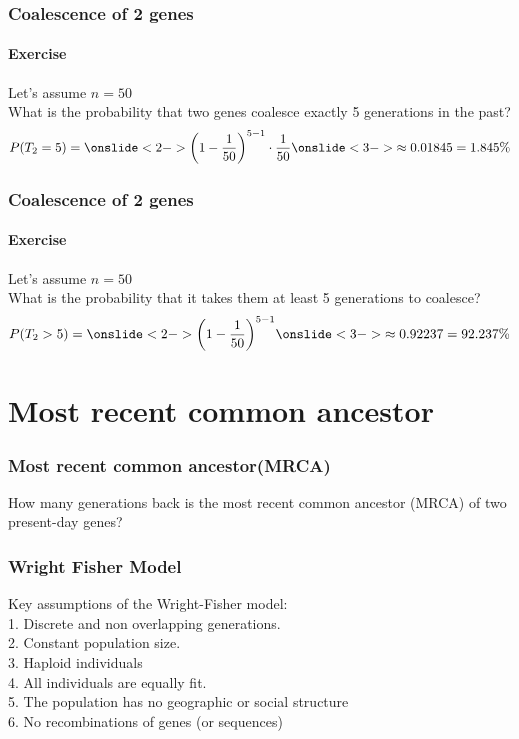 \documentclass{beamer}
\begin{document}
        \begin{frame}
            \frametitle{Coalescence of 2 genes}
            \framesubtitle{Exercise}
            Let's assume $n = 50$ \\
            What is the probability that two genes coalesce exactly 5 generations in the past? \\ 
                \[
                    P(T_{2} = 5) =
                    \onslide<2->{\left(1 - \frac{1}{50}\right)^{5-1} \cdot \frac{1}{50}}
                    \onslide<3->{\approx 0.01845 = 1.845\%}
                \]
        \end{frame}

        \begin{frame}
            \frametitle{Coalescence of 2 genes}
            \framesubtitle{Exercise}
            Let's assume $n = 50$ \\
            What is the probability that it takes them at least 5 generations to coalesce? \\ 
                \[
                    P(T_{2} > 5) =
                    \onslide<2->{\left(1 - \frac{1}{50}\right)^{5-1}}
                    \onslide<3->{\approx 0.92237 = 92.237\%}
                \]
        \end{frame}

    \section{Most recent common ancestor}
    \begin{frame}
        \frametitle{Most recent common ancestor(MRCA)}
        How many generations back is the most recent common ancestor (MRCA) of two present-day genes?
    \end{frame}

    \begin{frame}
        \frametitle{Wright Fisher Model}
        Key assumptions of the Wright-Fisher model: \\
        1. Discrete and non overlapping generations. \\
        2. Constant population size. \\
        3. Haploid individuals \\
        4. All individuals are equally fit. \\
        5. The population has no geographic or social structure\\
        6. No recombinations of genes (or sequences)



    
        
    
    \end{frame}
\end{document}
